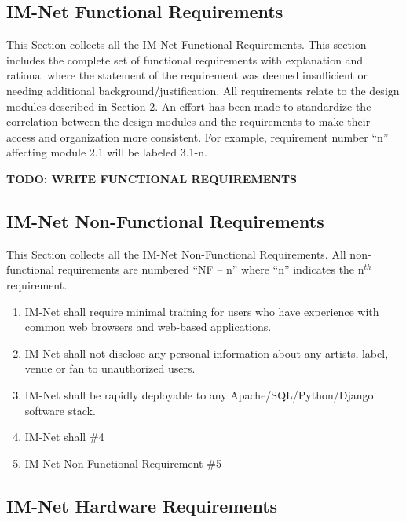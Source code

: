 \documentclass[letterpaper]{article}
\begin{document}
\subsection{\textcolor{subsection}{IM-Net Functional Requirements}}

This Section collects all the IM-Net Functional Requirements. This section includes the complete set of functional requirements with explanation and rational where the statement of the requirement was deemed insufficient or needing additional background/justification. All requirements relate to the design modules described in Section 2. An effort has been made to standardize the correlation between the design modules and the requirements to make their access and organization more consistent. For example, requirement number ``n'' affecting module 2.1 will be labeled 3.1-n.

\textbf{TODO: WRITE FUNCTIONAL REQUIREMENTS}\\

\subsection{\textcolor{subsection}{IM-Net Non-Functional Requirements}}

This Section collects all the IM-Net Non-Functional Requirements. All non-functional requirements are numbered ``NF -- n'' where ``n'' indicates the n${}^{th}$ requirement.

\begin{enumerate}
\item  IM-Net shall require minimal training for users who have experience with common web browsers and web-based applications.

\item  IM-Net shall not disclose any personal information about any artists, label, venue or fan to unauthorized users.

\item  IM-Net shall be rapidly deployable to any Apache/SQL/Python/Django software stack.

\item  IM-Net shall  \#4

\item  IM-Net Non Functional Requirement \#5
\end{enumerate}

\subsection{\textcolor{subsection}{IM-Net Hardware Requirements}}
\end{document}
